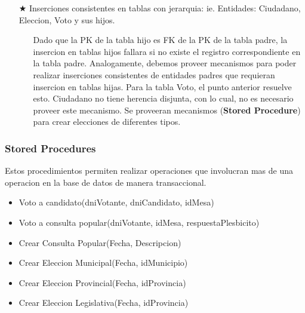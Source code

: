 \begin{itemize}
	\item[$\bigstar$] Inserciones consistentes en tablas con jerarquia: ie. Entidades: Ciudadano, Eleccion, Voto y sus hijos. 
	\begin{itemize}
		\item[\Checkmark] Dado que la PK de la tabla hijo es FK de la PK de la tabla padre, la insercion en tablas hijos fallara si no existe el registro correspondiente en la tabla padre. Analogamente, debemos proveer mecanismos para poder realizar inserciones consistentes de entidades padres que requieran insercion en tablas hijas. Para la tabla Voto, el punto anterior resuelve esto. Ciudadano no tiene herencia disjunta, con lo cual, no es necesario proveer este mecanismo. Se proveeran mecanismos (\textbf{Stored Procedure}) para crear elecciones de diferentes tipos. 
	\end{itemize}
\end{itemize}

\subsubsection{Stored Procedures}
Estos procedimientos permiten realizar operaciones que involucran mas de una operacion en la base de datos de manera transaccional.
\begin{itemize}
	\item Voto a candidato(dniVotante, dniCandidato, idMesa)
	\item Voto a consulta popular(dniVotante, idMesa, respuestaPlesbicito)
	\item Crear Consulta Popular(Fecha, Descripcion)
	\item Crear Eleccion Municipal(Fecha, idMunicipio)
	\item Crear Eleccion Provincial(Fecha, idProvincia)
	\item Crear Eleccion Legislativa(Fecha, idProvincia)
\end{itemize}